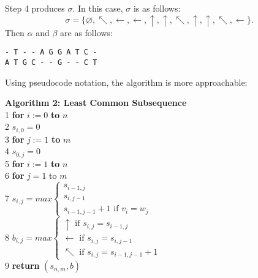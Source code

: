 \documentclass[a4paper]{article}
\begin{document}
Step 4 produces $\sigma$. In this case, $\sigma$ is as follows:
\[ \sigma = \{\varnothing, \nwarrow, \leftarrow, \leftarrow, \uparrow, \uparrow, \nwarrow, \uparrow, \uparrow, \nwarrow, \leftarrow\}. \]
Then $\alpha$ and $\beta$ are as follows:

\begin{center}
\verb+- T - - A G G A T C -+ \\
\verb+A T G C - - G - - C T+ 
\end{center}

Using pseudocode notation, the algorithm is more approachable: \\

\begin{adjustwidth}{.5in}{0pt}
\textbf{Algorithm 2: Least Common Subsequence} \\
1 \hspace{.25in} \textbf{for} $i := 0$ \textbf{to} $n$ \\
2 \hspace{.5in} $s_{i,0} = 0$ \\
3 \hspace{.25in} \textbf{for} $j := 1$ \textbf{to} $m$ \\
4 \hspace{.5in} $s_{0,j} = 0$ \\
5 \hspace{.25in} \textbf{for} $i := 1$ \textbf{to} $n$ \\
6 \hspace{.5in} \textbf{for} $j = 1$ to $m$ \\
7 \hspace{.75in} $s_{i,j} = max
\begin{cases}
s_{i-1,j} \\
s_{i,j-1} \\
s_{i-1,j-1} + 1 \text{ if } v_i = w_j
\end{cases} $ \\
8 \hspace{.75in} $b_{i,j} = max
\begin{cases}
\uparrow \text{ if } s_{i,j} = s_{i-1,j} \\
\leftarrow \text{ if } s_{i,j} = s_{i,j-1} \\
\nwarrow \text{ if } s_{i,j} = s_{i-1,j-1} + 1
\end{cases} $ \\
9 \hspace{.25in} \textbf{return} $(s_{n,m},b)$ \\
\end{adjustwidth}
\end{document}
